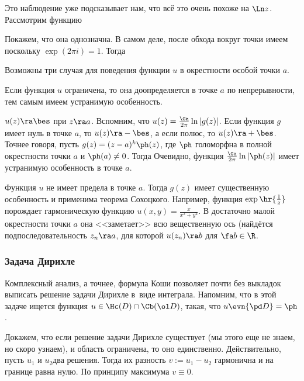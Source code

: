 \documentclass[a4paper]{article}
\begin{document}
Это наблюдение уже подсказывает нам, что всё это очень похоже на $\Ln z$. Рассмотрим функцию

Покажем, что она однозначна. В самом деле, после обхода вокруг точки имеем
поскольку $\exp(2\pi i)=1$. Тогда

Возможны три случая для поведения функции $u$ в окрестности особой точки $a$.

\begin{items}{-2}
\item Если функция $u$ ограничена, то она доопределяется в точке $a$ по непрерывности, тем самым имеем
устранимую особенность.
\item $u(z)\ra \bes$ при $z\ra a$. Вспомним, что $u(z) = \frac{\Ga}{2\pi}\ln|g(z)|$. Если функция $g$ имеет
нуль в точке $a$, то $u(z) \ra -\bes$, а если полюс, то $u(z)\ra +\bes$. Точнее говоря, пусть $g(z)=(z-a)^k\ph(z)$,
где $\ph$ голоморфна в полной окрестности точки $a$ и $\ph(a)\neq 0$. Тогда
Очевидно, функция $\frac{\Ga}{2\pi}\ln|\ph(z)|$ имеет устранимую особенность в точке $a$.
\item Функция $u$ не имеет предела в точке $a$. Тогда $g(z)$ имеет существенную особенность и  применима
теорема Сохоцкого. Например, функция $\exp\hr{\frac1z}$ порождает гармоническую функцию
$u(x,y) = \frac{x}{x^2+y^2}$. В достаточно малой окрестности точки $a$ она <<заметает>> всю вещественную
ось (найдётся подпоследовательность $z_n\ra a$, для которой $u(z_n) \ra b$ для $\fa b \in \R$.
\end{items}

\subsubsection{Задача Дирихле}

Комплексный анализ, а точнее, формула Коши позволяет почти без выкладок выписать решение задачи Дирихле
в~виде интеграла. Напомним, что в этой задаче ищется функция $u \in \Hc(D) \cap \Cb(\ol D)$, такая,
что $u\evn{\pd D} = \ph$.

Докажем, что если решение задачи Дирихле существует (мы этого еще не знаем, но скоро узнаем), и область
ограничена, то оно единственно. Действительно, пусть $u_1$ и $u_2$\т два решения. Тогда их разность
$v := u_1-u_2$ гармонична и на границе равна нулю. По принципу максимума $v \equiv 0$.
\end{document}
